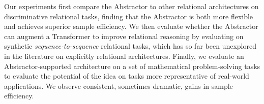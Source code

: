Our experiments first compare the Abstractor to other relational architectures on discriminative relational tasks, finding that the Abstractor is both more flexible and achieves superior sample efficiency. We then evaluate whether the Abstractor can augment a Transformer to improve relational reasoning by evaluating on synthetic \textit{sequence-to-sequence} relational tasks, which has so far been unexplored in the literature on explicitly relational architectures. Finally, we evaluate an Abstractor-supported architecture on a set of mathematical problem-solving tasks to evaluate the potential of the idea on tasks more representative of real-world applications. We observe consistent, sometimes dramatic, gains in sample-efficiency.